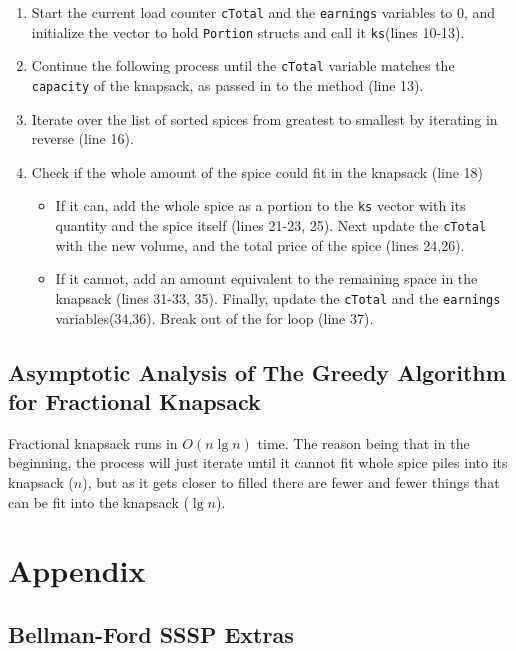 \documentclass[letterpaper, 10pt]{article}
\begin{document}
\begin{enumerate}
    \item Start the current load counter \texttt{cTotal} and the \texttt{earnings} variables to 0, and initialize the vector to hold \texttt{Portion} structs and call it \texttt{ks}(lines 10-13).
    \item Continue the following process until the \texttt{cTotal} variable matches the \texttt{capacity} of the knapsack, as passed in to the method (line 13).
    \item Iterate over the list of sorted spices from greatest to smallest by iterating in reverse (line 16).
    \item Check if the whole amount of the spice could fit in the knapsack (line 18)
        \begin{itemize}
            \item If it can, add the whole spice as a portion to the \texttt{ks} vector with its quantity and the spice itself (lines 21-23, 25). Next update the \texttt{cTotal} with the new volume, and the total price of the spice (lines 24,26).
            \item If it cannot, add an amount equivalent to the remaining space in the knapsack (lines 31-33, 35). Finally, update the \texttt{cTotal} and the \texttt{earnings} variables(34,36). Break out of the for loop (line 37).
        \end{itemize}

\end{enumerate}

\subsection{Asymptotic Analysis of The Greedy Algorithm for Fractional Knapsack}

Fractional knapsack runs in $O(n \lg{n})$ time. The reason being that in the beginning, the process will just iterate until it cannot fit whole spice piles into its knapsack ($n$), but as it gets closer to filled there are fewer and fewer things that can be fit into the knapsack ($\lg{n}$).


\newpage


\section{Appendix}

\subsection{Bellman-Ford SSSP Extras}
\end{document}
